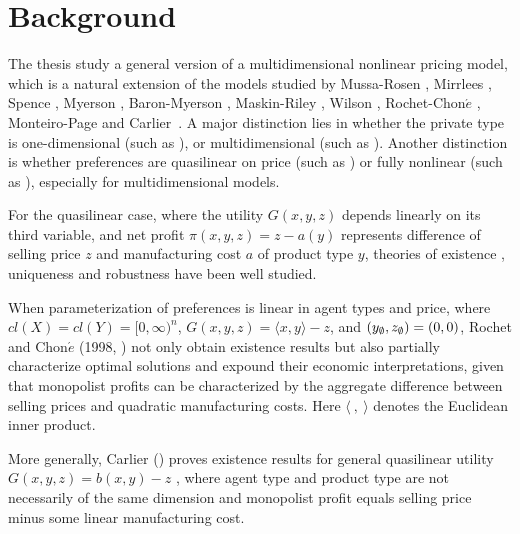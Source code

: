 \medskip


\section{Background}
The thesis study a general version of a multidimensional nonlinear pricing model,  which is a natural extension of the models studied by Mussa-Rosen \cite{MussaRosen78}, %
Mirrlees \cite{Mirrlees71},	Spence \cite{Spence74, Spence80}, Myerson \cite{Myerson81}, Baron-Myerson \cite{BaronMyerson82}, Maskin-Riley \cite{MaskinRiley84}, Wilson \cite{Wilson93}, Rochet-Chon$\acute{e}$ \cite{RochetChone98}, Monteiro-Page \cite{MonteiroPage98} and  Carlier~\cite{Carlier01}. A major distinction lies in whether the private type is one-dimensional (such as \cite{MussaRosen78, MaskinRiley84}), or multidimensional (such as \cite{QuinziiRochet85, RochetChone98,MonteiroPage98, Carlier01}). Another distinction is whether preferences are quasilinear on price (such as \cite{Armstrong96, Carlier01}) or fully nonlinear (such as \cite{NoldekeSamuelson15p, McCannZhang17}), especially for multidimensional models.  
	\medskip



	For the quasilinear case, where the utility $G(x,y,z)$ depends linearly on its third variable, and net profit $\pi(x,y,z)=z-a(y)$ represents difference of selling price $z$ and manufacturing cost $a$ of product type $y$, theories of existence \cite{Basov05,RochetStole03,Carlier01,MonteiroPage98}, uniqueness 
	\cite{CarlierLachand-Robert01,FigalliKimMcCann11,MussaRosen78,RochetChone98} 
	and robustness \cite{Basov05,FigalliKimMcCann11} have been well studied.
\medskip

When parameterization of preferences is linear in agent types and price, where $ cl(X) = cl(Y) = [0,\infty)^n$, $G(x,y,z) = \langle x,y \rangle -z$,  %
and $(y_{\emptyset},z_{\emptyset})=(0,0)$, Rochet and Chon$\acute{e}$ (1998, \cite{RochetChone98}) not only obtain existence results but also partially characterize optimal solutions and expound their economic interpretations, %
given that monopolist profits can be characterized by {the aggregate difference between selling prices and quadratic manufacturing costs.} Here $\langle\ ,\ \rangle$ denotes the Euclidean inner product.\medskip

More generally, Carlier (\cite{Carlier01}) proves existence results for general quasilinear utility  $G(x,y,z) = b(x,y)- z$ , where agent type and product type are not necessarily of the same dimension and monopolist profit equals selling price minus some linear manufacturing cost.\medskip

